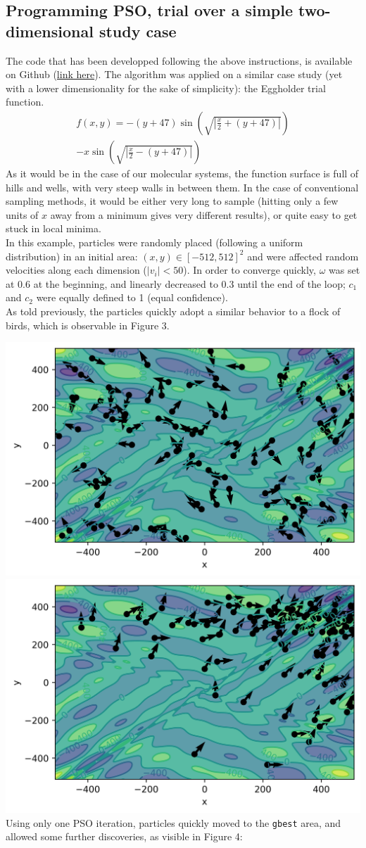 \documentclass[11pt]{article}
\begin{document}
\begin{multicols}{2}
\subsection*{Programming PSO, trial over a simple two-dimensional study case}
The code that has been developped following the above instructions, is available on Github (\href{https://github.com/antoinegslr/ParticleSwarnOptimization}{link here}). The algorithm was applied on a similar case study (yet with a lower dimensionality for the sake of simplicity): the Eggholder trial function.
\begin{multline*}
    f(x,y)=-(y+47)\sin\left(\sqrt{\left|\frac{x}{2}+(y+47)\right|}\right)\\-x\sin\left(\sqrt{\left|\frac{x}{2}-(y+47)\right|}\right)
\end{multline*}
As it would be in the case of our molecular systems, the function surface is full of hills and wells, with very steep walls in between them. In the case of conventional sampling methods, it would be either very long to sample (hitting only a few units of $x$ away from a minimum gives very different results), or quite easy to get stuck in local minima.\\
In this example, particles were randomly placed (following a uniform distribution) in an initial area: $(x,y)\in\left[-512,512\right]^2$ and were affected random velocities along each dimension ($|v_i|<50$). In order to converge quickly, $\omega$ was set at 0.6 at the beginning, and linearly decreased to 0.3 until the end of the loop; $c_1$ and $c_2$ were equally defined to 1 (equal confidence).\\
As told previously, the particles quickly adopt a similar behavior to a flock of birds, which is observable in Figure 3.
\bigskip

\noindent\includegraphics[width=0.5\columnwidth]{figures/ite0.png}\includegraphics[width=0.5\columnwidth]{figures/ite1.png}
\medskip
Using only one PSO iteration, particles quickly moved to the \verb+gbest+ area, and allowed some further discoveries, as visible in Figure 4:
\bigskip


\end{multicols}
\end{document}
